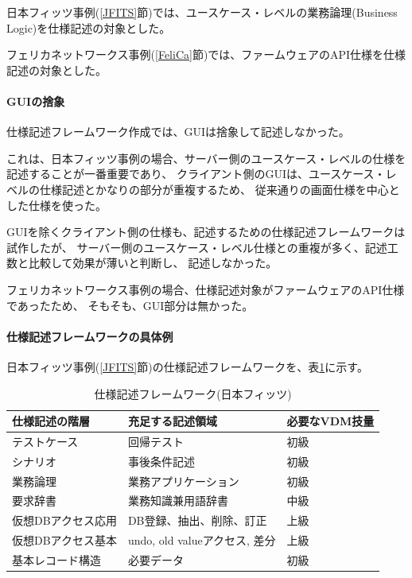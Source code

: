 	日本フィッツ事例(\ref{JFITS}節)では、ユースケース・レベルの業務論理(Business Logic)を仕様記述の対象とした。
	
	フェリカネットワークス事例(\ref{FeliCa}節)では、ファームウェアのAPI仕様を仕様記述の対象とした。

	\paragraph{GUIの捨象}
	仕様記述フレームワーク作成では、GUIは捨象して記述しなかった。

	これは、日本フィッツ事例の場合、サーバー側のユースケース・レベルの仕様を記述することが一番重要であり、
	クライアント側のGUIは、ユースケース・レベルの仕様記述とかなりの部分が重複するため、
	従来通りの画面仕様を中心とした仕様を使った。

	GUIを除くクライアント側の仕様も、記述するための仕様記述フレームワークは試作したが、
	サーバー側のユースケース・レベル仕様との重複が多く、記述工数と比較して効果が薄いと判断し、
	記述しなかった。
	
	フェリカネットワークス事例の場合、仕様記述対象がファームウェアのAPI仕様であったため、
	そもそも、GUI部分は無かった。

	\paragraph{仕様記述フレームワークの具体例}

	日本フィッツ事例(\ref{JFITS}節)の仕様記述フレームワークを、表\ref{SpecFrameJFITS}に示す。

\begin{table}[h]
	\caption[仕様記述フレームワーク(日本フィッツ)]{仕様記述フレームワーク(日本フィッツ)}
	\label{SpecFrameJFITS}
	\begin{center}
		\setlength{\tabcolsep}{3pt}
		\begin{tabular}{|l|l|l|} \hline
			仕様記述の階層 & 充足する記述領域 & 必要なVDM技量  \\ \hline\hline
			テストケース  & 回帰テスト & 初級 \\ \hline
			シナリオ  & 事後条件記述 & 初級 \\ \hline
			業務論理  & 業務アプリケーション & 初級 \\ \hline
			要求辞書  & 業務知識兼用語辞書 & 中級 \\ \hline
			仮想DBアクセス応用  & DB登録、抽出、削除、訂正 & 上級 \\ \hline
			仮想DBアクセス基本  & undo, old valueアクセス, 差分 & 上級 \\ \hline
			基本レコード構造  & 必要データ & 初級 \\ \hline
		\end{tabular}
	\end{center}
\end{table}

